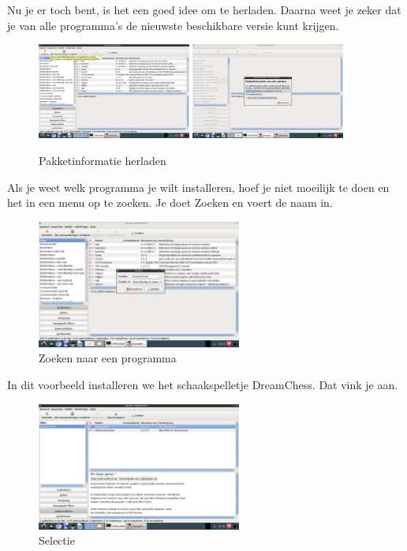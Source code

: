 \documentclass[12pt,a4paper]{article}
\begin{document}
Nu je er toch bent, is het een goed idee om te herladen. Daarna weet je zeker dat je van alle programma's de nieuwste beschikbare versie kunt krijgen.

\begin{figure} [H]
\centering
\includegraphics[width=0.45\textwidth]{plaatje04}
\includegraphics[width=0.45\textwidth]{plaatje05}
\caption{Pakketinformatie herladen}
\label{plaatje04}
\end{figure}

Als je weet welk programma je wilt installeren, hoef je niet moeilijk te doen en het in een menu op te zoeken. Je doet Zoeken en voert de naam in.

\begin{figure} [H]
\centering
\includegraphics[width=0.6\textwidth]{plaatje06}
\caption{Zoeken naar een programma}
\label{plaatje06}
\end{figure}

In dit voorbeeld installeren we het schaakspelletje DreamChess. Dat vink je aan.	

\begin{figure} [H]
\centering
\includegraphics[width=0.6\textwidth]{plaatje07}
\caption{Selectie}
\label{plaatje07}
\end{figure}
\end{document}

